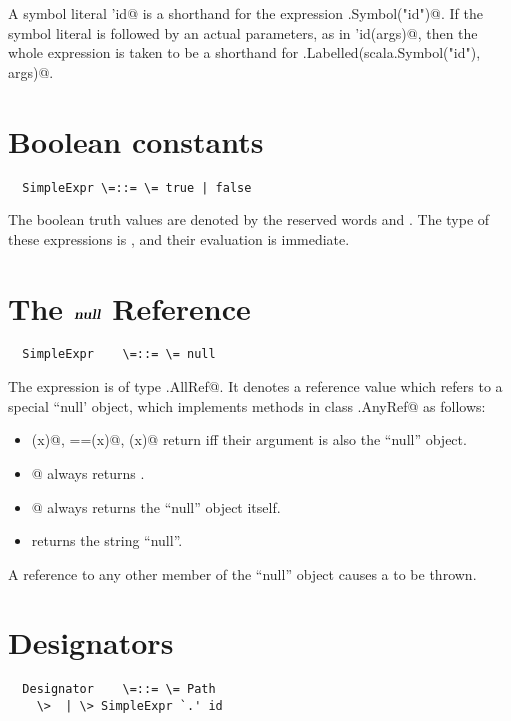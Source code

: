 \documentclass[11pt]{report}
\begin{document}
A symbol literal \verb@'id@ is a shorthand for the expression
\verb@scala.Symbol("id")@. If the symbol literal is followed by an
actual parameters, as in \verb@'id(args)@, then the whole expression
is taken to be a shorthand for
\verb@scala.Labelled(scala.Symbol("id"), args)@.

\section{Boolean constants}

\begin{verbatim}
  SimpleExpr \=::= \= true | false
\end{verbatim}

The boolean truth values are denoted by the reserved words \verb@true@
and \verb@false@. The type of these expressions is \verb@boolean@, and
their evaluation is immediate. 

\section{The $\mbox{\sl\bfseries null}$ Reference}

\syntax\begin{verbatim}
  SimpleExpr    \=::= \= null
\end{verbatim}

The \verb@null@ expression is of type \verb@scala.AllRef@. It
denotes a reference value which refers to a special ``null' object,
which implements methods in class \verb@scala.AnyRef@ as follows:
\begin{itemize}
\item[]
\verb@eq(x)@, \verb@==(x)@, \verb@equals(x)@ return \verb@true@ iff their
argument \verb@x@ is also the ``null'' object.
\item[]
\verb@isInstanceOf[T]@ always returns \verb@false@.
\item[]
\verb@asInstanceOf[T]@ always returns the ``null'' object itself.
\item[]
\verb@toString@ returns the string ``null''.
\end{itemize}
A reference to any other member of the ``null'' object causes a
\verb@NullPointerException@ to be thrown. 

\section{Designators}
\label{sec:designators}

\syntax\begin{verbatim}
  Designator    \=::= \= Path
	\>  | \> SimpleExpr `.' id
\end{verbatim}
\end{document}
